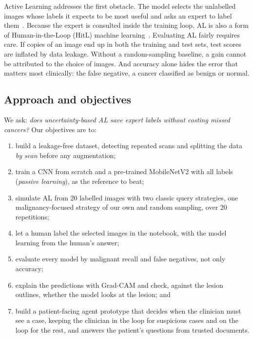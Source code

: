 \documentclass{article}
\begin{document}
Active Learning addresses the first obstacle. The model selects the unlabelled images whose
labels it expects to be most useful and asks an expert to label them~\cite{settles2009survey}.
Because the expert is consulted inside the training loop, AL is also a form of
Human-in-the-Loop (HitL) machine learning~\cite{budd2021survey,hcai_slides_hitl}.
Evaluating AL fairly requires care. If copies of an image end up in both the training and
test sets, test scores are inflated by data leakage. Without a
random-sampling baseline, a gain cannot be attributed to the choice of images. And accuracy
alone hides the error that matters most clinically: the false negative, a cancer classified
as benign or normal.

\subsection{Approach and objectives}
We ask: \emph{does uncertainty-based AL save expert labels without costing missed
cancers?} Our objectives are to:
\begin{enumerate}
\item build a leakage-free dataset, detecting repeated scans and splitting the data
\emph{by scan} before any augmentation;
\item train a CNN from scratch and a pre-trained MobileNetV2 with all labels
(\emph{passive learning}), as the reference to beat;
\item simulate AL from 20 labelled images with two classic query strategies, one
malignancy-focused strategy of our own and random sampling, over 20 repetitions;
\item let a human label the selected images in the notebook, with the model learning from
the human's answer;
\item evaluate every model by malignant recall and false negatives, not only accuracy;
\item explain the predictions with Grad-CAM and check, against the lesion outlines, whether
the model looks at the lesion; and
\item build a patient-facing agent prototype that decides when the clinician must see a
case, keeping the clinician in the loop for suspicious cases and on the loop for the rest,
and answers the patient's questions from trusted documents.
\end{enumerate}
\end{document}
